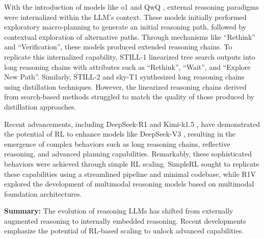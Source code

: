 With the introduction of models like o1 \cite{openai_o1} and QwQ \cite{qwq-32b-preview}, external reasoning paradigms were internalized within the LLM's context. 
These models initially performed exploratory macro-planning to generate an initial reasoning path, followed by contextual exploration of alternative paths. 
Through mechanisms like ``Rethink'' and ``Verification'', these models produced extended reasoning chains. 
To replicate this internalized capability, STILL-1 \cite{Renda_Report_Tree_Search} linearized tree search outputs into long reasoning chains with attributes such as ``Rethink'', ``Wait'', and ``Explore New Path''. 
Similarly, STILL-2 \cite{Slow_Thinking_with_LLMs_2} and sky-T1 \cite{sky_t1_2025} synthesized long reasoning chains using distillation techniques. 
However, the linearized reasoning chains derived from search-based methods struggled to match the quality of those produced by distillation approaches.





Recent advancements, including DeepSeek-R1 \cite{Deepseek-R1} and Kimi-k1.5 \cite{team2025kimi}, have demonstrated the potential of RL to enhance models like DeepSeek-V3 \cite{liu2024deepseek}, resulting in the emergence of complex behaviors such as long reasoning chains, reflective reasoning, and advanced planning capabilities. 
Remarkably, these sophisticated behaviors were achieved through simple RL scaling. 
SimpleRL \cite{simplerl_reason_blob} sought to replicate these capabilities using a streamlined pipeline and minimal codebase, while R1V \cite{chen2025r1v} explored the development of multimodal reasoning models based on multimodal foundation architectures.


\noindent\textbf{Summary:} The evolution of reasoning LLMs has shifted from externally augmented reasoning to internally embedded reasoning. 
Recent developments emphasize the potential of RL-based scaling to unlock advanced capabilities.

